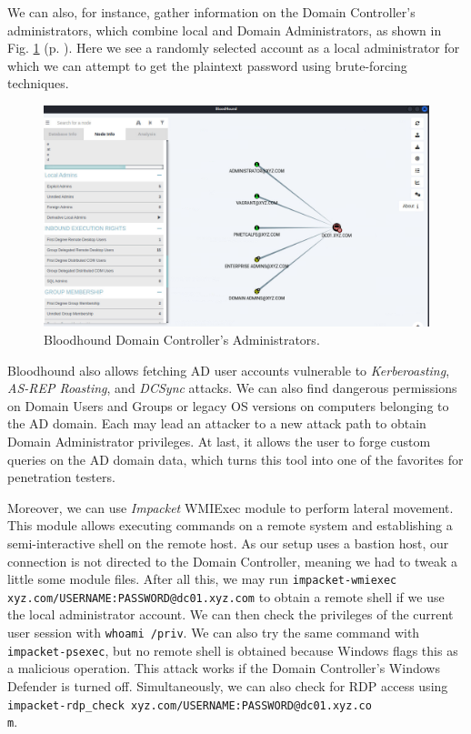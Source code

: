 We can also, for instance, gather information on the Domain Controller's administrators, which combine local and Domain Administrators, as shown in Fig. \ref{fig:bloodhound_dc_admins} (p. \pageref{fig:bloodhound_dc_admins}). Here we see a randomly selected account as a local administrator for which we can attempt to get the plaintext password using brute-forcing techniques.

\begin{figure}[H]
    \includegraphics[width=12cm]{figures/bloodhound_dc_admins.png}
    \caption{Bloodhound Domain Controller's Administrators.}
    \label{fig:bloodhound_dc_admins}
\end{figure}

Bloodhound also allows fetching AD user accounts vulnerable to \textit{Kerberoasting}, \textit{AS-REP Roasting}, and \textit{DCSync} attacks. We can also find dangerous permissions on Domain Users and Groups or legacy OS versions on computers belonging to the AD domain. Each may lead an attacker to a new attack path to obtain Domain Administrator privileges. At last, it allows the user to forge custom queries on the AD domain data, which turns this tool into one of the favorites for penetration testers. 

Moreover, we can use \textit{Impacket} WMIExec module to perform lateral movement. This module allows executing commands on a remote system and establishing a semi-interactive shell on the remote host. As our setup uses a bastion host, our connection is not directed to the Domain Controller, meaning we had to tweak a little some module files. After all this, we may run \texttt{impacket-wmiexec xyz.com/USERNAME:PASSWORD@dc01.xyz.com} to obtain a remote shell if we use the local administrator account. We can then check the privileges of the current user session with \texttt{whoami /priv}. We can also try the same command with \texttt{impacket-psexec}, but no remote shell is obtained because Windows flags this as a malicious operation. This attack works if the Domain Controller's Windows Defender is turned off. Simultaneously, we can also check for RDP access using \texttt{impacket-rdp\_check xyz.com/USERNAME:PASSWORD@dc01.xyz.co\\m}.

